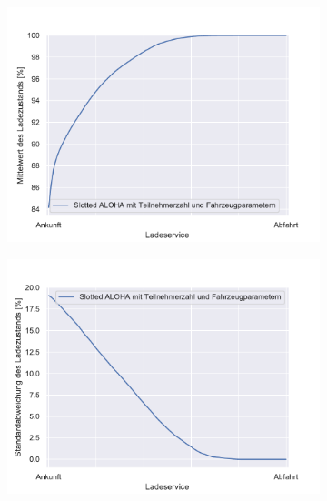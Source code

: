 \begin{figure}
	\begin{subfigure}{0.49\linewidth}
		\includegraphics[width=\linewidth]{img/SA_wt_trafo/SlottedAloha_waitingTime_VDE_tau_trafo_13_soc_mean.pdf}
        \label{ABB_SAwtTrafo_SocMEAN}
	\end{subfigure}
	\begin{subfigure}{0.49\linewidth}
		\includegraphics[width=\linewidth]{img/SA_wT_trafo/SlottedAloha_waitingTime_VDE_tau_trafo_13_soc_std.pdf}
        \label{ABB_SAwtTrafo_SocSTD}
	\end{subfigure}
\end{figure}
